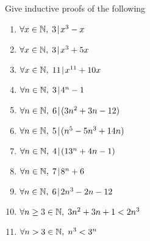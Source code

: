 
Give inductive proofs of the following 
\begin{enumerate}
\item $\forall x \in {\mathbb N}, \; 3 \!\mid\! x^3-x$

\wbvfill


\item $\forall x \in {\mathbb N}, \; 3 \!\mid\! x^3+5x$

\wbvfill

\workbookpagebreak

\item $\forall x \in {\mathbb N}, \; 11 \!\mid\! x^{11}+10x$

\wbvfill


\item $\forall n \in {\mathbb N}, \; 3 \!\mid\! 4^n-1$

\wbvfill

\workbookpagebreak

\item $\forall n \in {\mathbb N}, \; 6 \!\mid\! (3n^{2}+3n-12)$

\wbvfill


\item $\forall n \in {\mathbb N}, \; 5 \!\mid\! (n^{5}-5n^{3}+14n)$

\wbvfill

\workbookpagebreak

\item $\forall n \in {\mathbb N}, \; 4 \!\mid\! (13^{n}+4n-1)$

\wbvfill


\item $\forall n \in {\mathbb N}, \; 7 \!\mid\! 8^n+6$

\wbvfill

\workbookpagebreak

\item $\forall n \in {\mathbb N}, \; 6 \!\mid\! 2n^3 - 2n - 12$

\wbvfill


\item $\forall n \geq 3 \in {\mathbb N}, \; 3n^2+3n+1 < 2n^3$

\wbvfill

\workbookpagebreak

\item $\forall n > 3 \in {\mathbb N}, \; n^3 < 3^n$


\end{enumerate}
